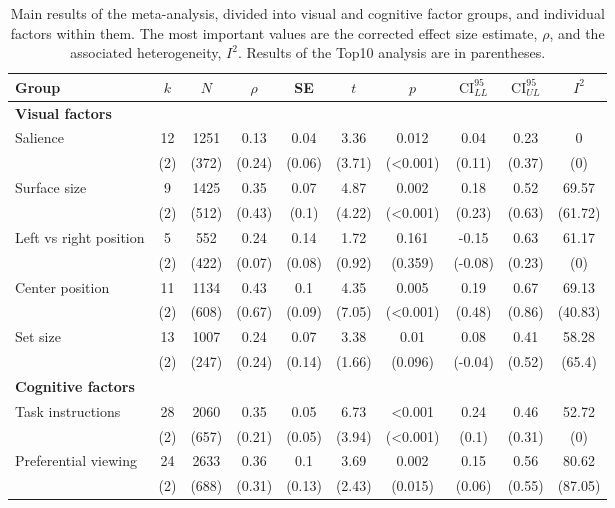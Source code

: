 \begin{table}[ht]
\centering
\caption{Main results of the meta-analysis, divided into visual and cognitive factor groups, and individual factors within them. The most important values are the corrected effect size estimate, $\rho$, and the associated heterogeneity, $I^2$. 
                Results of the Top10 analysis are in parentheses.} 
\label{tab:main_results}
\begingroup\small
\begin{tabular}{lccccccccc}
  \hline
Group & $k$ & $N$ & $\rho$ & SE & $t$ & $p$ & $\textrm{CI}^{95}_{LL}$ & $\textrm{CI}^{95}_{UL}$ & $I^2$ \\ 
  \hline
\textbf{Visual factors} &  &  &  &  &  &  &  &  &  \\ 
  Salience & 12 & 1251 & 0.13 & 0.04 & 3.36 & 0.012 & 0.04 & 0.23 & 0 \\ 
   & (2) & (372) & (0.24) & (0.06) & (3.71) & (<0.001) & (0.11) & (0.37) & (0) \\ 
  Surface size & 9 & 1425 & 0.35 & 0.07 & 4.87 & 0.002 & 0.18 & 0.52 & 69.57 \\ 
   & (2) & (512) & (0.43) & (0.1) & (4.22) & (<0.001) & (0.23) & (0.63) & (61.72) \\ 
  Left vs right position & 5 & 552 & 0.24 & 0.14 & 1.72 & 0.161 & -0.15 & 0.63 & 61.17 \\ 
   & (2) & (422) & (0.07) & (0.08) & (0.92) & (0.359) & (-0.08) & (0.23) & (0) \\ 
  Center position & 11 & 1134 & 0.43 & 0.1 & 4.35 & 0.005 & 0.19 & 0.67 & 69.13 \\ 
   & (2) & (608) & (0.67) & (0.09) & (7.05) & (<0.001) & (0.48) & (0.86) & (40.83) \\ 
  Set size & 13 & 1007 & 0.24 & 0.07 & 3.38 & 0.01 & 0.08 & 0.41 & 58.28 \\ 
   & (2) & (247) & (0.24) & (0.14) & (1.66) & (0.096) & (-0.04) & (0.52) & (65.4) \\ 
  \textbf{Cognitive factors} &  &  &  &  &  &  &  &  &  \\ 
  Task instructions & 28 & 2060 & 0.35 & 0.05 & 6.73 & <0.001 & 0.24 & 0.46 & 52.72 \\ 
   & (2) & (657) & (0.21) & (0.05) & (3.94) & (<0.001) & (0.1) & (0.31) & (0) \\ 
  Preferential viewing & 24 & 2633 & 0.36 & 0.1 & 3.69 & 0.002 & 0.15 & 0.56 & 80.62 \\ 
   & (2) & (688) & (0.31) & (0.13) & (2.43) & (0.015) & (0.06) & (0.55) & (87.05) \\ 

\end{tabular}
\end{table}
